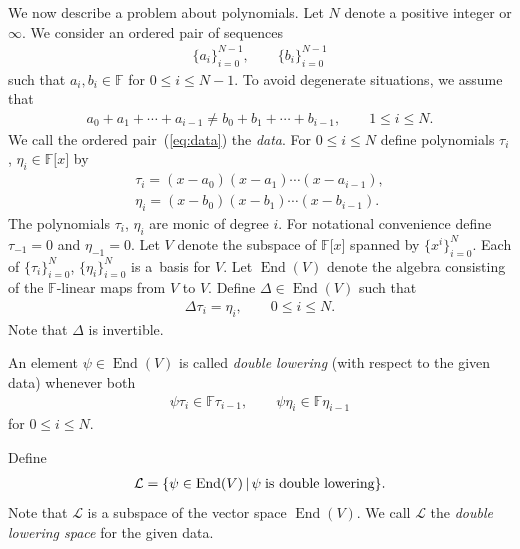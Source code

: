 \documentclass[pdftex]{sigma}
\numberwithin{equation}{section}
\begin{document}
We now describe a problem about polynomials.
Let $N$ denote a positive integer or $\infty$.
We consider an ordered pair of sequences
\begin{gather}
\lbrace a_i \rbrace_{i=0}^{N-1}, \qquad
\lbrace b_i \rbrace_{i=0}^{N-1}
\label{eq:data}
\end{gather}
such that $a_i, b_i \in \mathbb F$ for $0 \leq i \leq N-1$.
To avoid degenerate situations, we assume that
\begin{gather}
a_0 + a_1 + \cdots + a_{i-1} \not=
b_0 + b_1 + \cdots + b_{i-1},
\qquad 1 \leq i \leq N.
\label{eq:nondeg}
\end{gather}
We call the ordered pair~(\ref{eq:data})
the {\it data}.
For $0 \leq i \leq N$ define polynomials
$\tau_i$, $\eta_i \in
\mathbb F\lbrack x \rbrack$ by
\begin{gather}
\tau_i = (x - a_0)(x-a_1)\cdots (x - a_{i-1}),\label{eq:tau}\\
\eta_i = (x - b_0)(x-b_1)\cdots (x - b_{i-1}).\label{eq:eta}
\end{gather}
The polynomials $\tau_i$, $\eta_i$ are monic of degree $i$.
For notational convenience define $\tau_{-1} = 0$ and
$\eta_{-1} = 0$.
Let $V$ denote the subspace of
$\mathbb F\lbrack x \rbrack$
spanned by $\lbrace x^i \rbrace_{i=0}^{N}$.
Each of
$\lbrace \tau_i \rbrace_{i=0}^{N}$,
$\lbrace \eta_i \rbrace_{i=0}^{N}$ is a~basis for $V$.
Let $\operatorname{End}(V)$ denote the algebra consisting of the
$\mathbb F$-linear maps from $V$ to $V$.
Define $\Delta \in \operatorname{End}(V)$ such that
\begin{gather}
\Delta \tau_i = \eta_i, \qquad 0 \leq i \leq N.
\label{def:Delta}
\end{gather}
Note that $\Delta$ is invertible.

\begin{Definition}\label{def:dlowering}
An element $\psi \in \operatorname{End}(V)$ is called {\it double lowering}
(with respect to the given data)
whenever both
\begin{gather*}
\psi \tau_i \in \mathbb F \tau_{i-1}, \qquad
\psi \eta_i \in \mathbb F \eta_{i-1}
\end{gather*}
for $0 \leq i \leq N$.
\end{Definition}

\begin{Definition}\label{def:dl}
Define
\begin{gather*}
\mathcal L = \lbrace \psi \in \operatorname{End}(V) \,|\, \psi \;
{\mbox{\rm is double lowering}}
\rbrace.
\end{gather*}
Note that
$\mathcal L $ is a subspace of the vector space
$\operatorname{End}(V)$. We call
$\mathcal L $ the {\it double lowering space} for
the given data.
\end{Definition}
\end{document}
